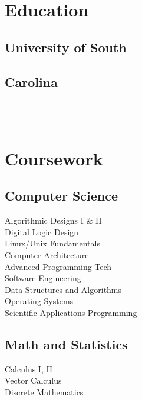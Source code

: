 \documentclass[letterpaper]{deedy-resume}
\begin{document}
\begin{minipage}[t]{0.29\textwidth} 

\section{Education} 

\subsection{University of South}
\subsection{Carolina}

 \\
 \\

\sectionspace 

\section{Coursework}

\subsection{Computer Science}
Algorithmic Designs I \& II \\
Digital Logic Design \\
Linux/Unix Fundamentals \\
Computer Architecture \\
Advanced Programming Tech \\
Software Engineering \\
Data Structures and Algorithms \\
Operating Systems \\
Scientific Applications Programming \\

\sectionspace
\subsection{Math and Statistics}
Calculus I, II \\
Vector Calculus \\
Discrete Mathematics \\




\end{minipage}
\end{document}

